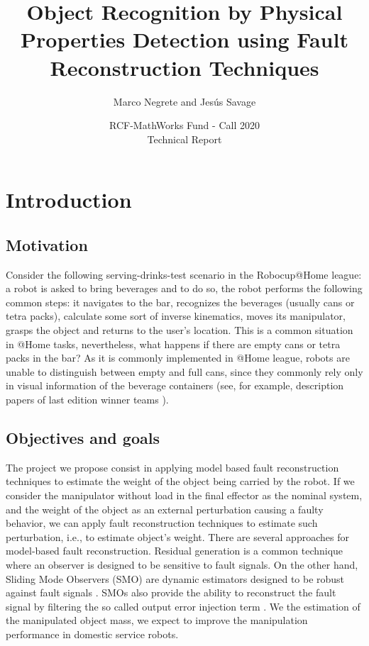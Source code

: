 \documentclass[a4paper, 10pt]{article}
\title{Object Recognition by Physical Properties Detection using Fault Reconstruction Techniques}
\author{Marco Negrete and Jesús Savage}
\date{RCF-MathWorks Fund - Call 2020\\Technical Report}
\begin{document}
\maketitle

\section{Introduction}
\subsection{Motivation}
Consider the following serving-drinks-test scenario in the Robocup@Home league: a robot is asked to bring beverages and to do so, the robot performs the following common steps: it navigates to the bar, recognizes the beverages (usually cans or tetra packs), calculate some sort of inverse kinematics, moves its manipulator, grasps the object and returns to the user's location. This is a common situation in @Home tasks, nevertheless, what happens if there are empty cans or tetra packs in the bar? As it is commonly implemented in @Home league, robots are unable to distinguish between empty and full cans, since they commonly rely only in visual information of the beverage containers (see, for example, description papers of last edition winner teams \cite{tdp2019Eindhoven, tdp2019Homer, tdp2019UTS}).
\subsection{Objectives and goals}
The project we propose consist in applying model based fault reconstruction techniques \cite{ding2013model} to estimate the weight of the object being carried by the robot. If we consider the manipulator without load in the final effector as the nominal system, and the weight of the object as an external perturbation causing a faulty behavior, we can apply fault reconstruction techniques to estimate such perturbation, i.e., to estimate object's weight. There are several approaches for model-based fault reconstruction. Residual generation is a common technique where an observer is designed to be sensitive to fault signals. On the other hand, Sliding Mode Observers (SMO) are dynamic estimators designed to be robust against fault signals \cite{shtessel2014sliding}. SMOs also provide the ability to reconstruct the fault signal by filtering the so called output error injection term \cite{alwi2011fault}. We the estimation of the manipulated object mass, we expect to improve the manipulation performance in domestic service robots. 
\end{document}
